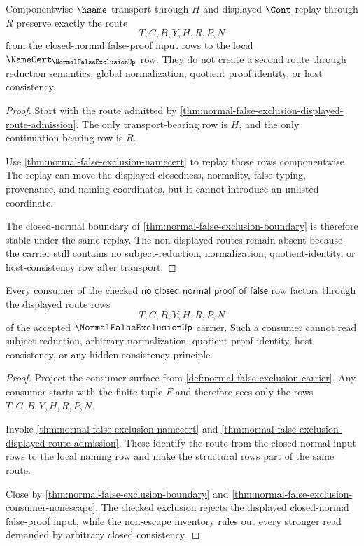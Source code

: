 \begin{theorem}
\label{thm:normal-false-exclusion-route-stability}
Componentwise $\hsame$ transport through $H$ and displayed $\Cont$ replay through $R$ preserve exactly the route
$$
T,C,B,Y,H,R,P,N
$$
from the closed-normal false-proof input rows to the local $\NameCert_{\NormalFalseExclusionUp}$ row. They do not create a second route through reduction semantics, global normalization, quotient proof identity, or host consistency.
\end{theorem}
\begin{proof}
Start with the route admitted by \autoref{thm:normal-false-exclusion-displayed-route-admission}. The only transport-bearing row is $H$, and the only continuation-bearing row is $R$.

Use \autoref{thm:normal-false-exclusion-namecert} to replay those rows componentwise. The replay can move the displayed closedness, normality, false typing, provenance, and naming coordinates, but it cannot introduce an unlisted coordinate.

The closed-normal boundary of \autoref{thm:normal-false-exclusion-boundary} is therefore stable under the same replay. The non-displayed routes remain absent because the carrier still contains no subject-reduction, normalization, quotient-identity, or host-consistency row after transport.
\end{proof}

\begin{theorem}
\label{thm:normal-false-exclusion-consumer-route-exactness}
Every consumer of the checked $\mathsf{no\_closed\_normal\_proof\_of\_false}$ row factors through the displayed route rows
$$
T,C,B,Y,H,R,P,N
$$
of the accepted $\NormalFalseExclusionUp$ carrier. Such a consumer cannot read subject reduction, arbitrary normalization, quotient proof identity, host consistency, or any hidden consistency principle.
\end{theorem}
\begin{proof}
Project the consumer surface from \autoref{def:normal-false-exclusion-carrier}. Any consumer starts with the finite tuple $F$ and therefore sees only the rows $T,C,B,Y,H,R,P,N$.

Invoke \autoref{thm:normal-false-exclusion-namecert} and \autoref{thm:normal-false-exclusion-displayed-route-admission}. These identify the route from the closed-normal input rows to the local naming row and make the structural rows part of the same route.

Close by \autoref{thm:normal-false-exclusion-boundary} and \autoref{thm:normal-false-exclusion-consumer-nonescape}. The checked exclusion rejects the displayed closed-normal false-proof input, while the non-escape inventory rules out every stronger read demanded by arbitrary closed consistency.
\end{proof}

